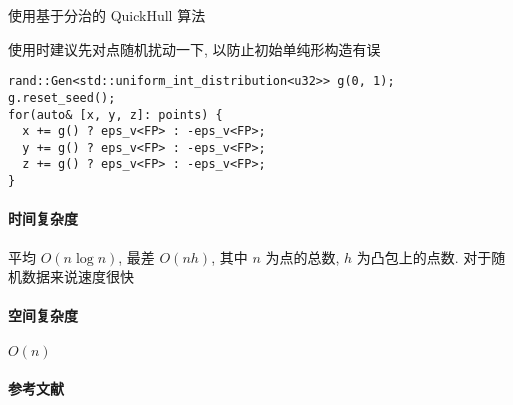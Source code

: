 使用基于分治的 QuickHull 算法

使用时建议先对点随机扰动一下, 以防止初始单纯形构造有误

\begin{verbatim}
rand::Gen<std::uniform_int_distribution<u32>> g(0, 1);
g.reset_seed();
for(auto& [x, y, z]: points) {
  x += g() ? eps_v<FP> : -eps_v<FP>;
  y += g() ? eps_v<FP> : -eps_v<FP>;
  z += g() ? eps_v<FP> : -eps_v<FP>;
}
\end{verbatim}

\paragraph{时间复杂度} 平均 \(O(n\log n)\), 最差 \(O(nh)\), 其中 \(n\) 为点的总数, \(h\) 为凸包上的点数. 对于随机数据来说速度很快

\paragraph{空间复杂度} \(O(n)\)

\paragraph{参考文献} \cite{barber1996quickhull}